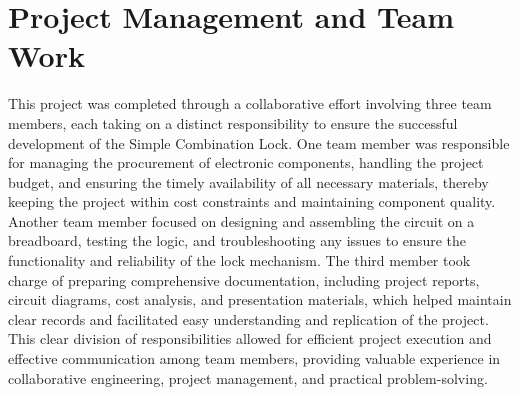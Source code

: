 \section{Project Management and Team Work}
This project was completed through a collaborative effort involving three team members, each taking on a distinct responsibility to ensure the successful development of the Simple Combination Lock. One team member was responsible for managing the procurement of electronic components, handling the project budget, and ensuring the timely availability of all necessary materials, thereby keeping the project within cost constraints and maintaining component quality. Another team member focused on designing and assembling the circuit on a breadboard, testing the logic, and troubleshooting any issues to ensure the functionality and reliability of the lock mechanism. The third member took charge of preparing comprehensive documentation, including project reports, circuit diagrams, cost analysis, and presentation materials, which helped maintain clear records and facilitated easy understanding and replication of the project. This clear division of responsibilities allowed for efficient project execution and effective communication among team members, providing valuable experience in collaborative engineering, project management, and practical problem-solving.\cite{4.2}


